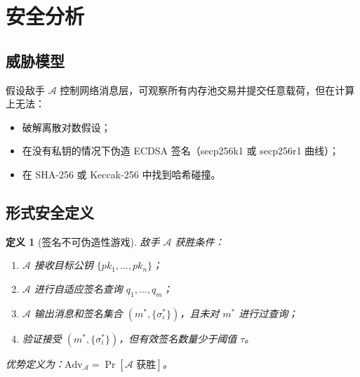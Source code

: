 \documentclass[10pt]{article}
\newtheorem{definition}{定义}[section]
\begin{document}
\section{安全分析}

\subsection{威胁模型}

假设敌手 $\mathcal{A}$ 控制网络消息层，可观察所有内存池交易并提交任意载荷，但在计算上无法：
\begin{itemize}[leftmargin=*,topsep=2pt,itemsep=1pt]
  \item 破解离散对数假设；
  \item 在没有私钥的情况下伪造 ECDSA 签名（secp256k1 或 secp256r1 曲线）；
  \item 在 SHA-256 或 Keccak-256 中找到哈希碰撞。
\end{itemize}

\subsection{形式安全定义}

\begin{definition}[签名不可伪造性游戏]
敌手 $\mathcal{A}$ 获胜条件：
\begin{enumerate}[leftmargin=*,topsep=2pt,itemsep=1pt,label=\textbf{\arabic*.}]
  \item $\mathcal{A}$ 接收目标公钥 $\{pk_1, \ldots, pk_n\}$；
  \item $\mathcal{A}$ 进行自适应签名查询 $q_1, \ldots, q_m$；
  \item $\mathcal{A}$ 输出消息和签名集合 $(m^*, \{\sigma_i^*\})$，且未对 $m^*$ 进行过查询；
  \item 验证接受 $(m^*, \{\sigma_i^*\})$，但有效签名数量少于阈值 $\tau$。
\end{enumerate}
优势定义为：$\text{Adv}_{\mathcal{A}} = \Pr[\mathcal{A} \text{ 获胜}]$。
\end{definition}
\end{document}
